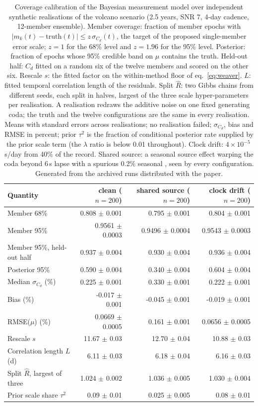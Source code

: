 \begin{table}
\footnotesize
\caption{Coverage calibration of the Bayesian measurement model over independent synthetic realisations of the volcano scenario (2.5 years, SNR 7, 4-day cadence, 12-member ensemble). Member coverage: fraction of member epochs with $|m_k(t)-\mathrm{truth}(t)|\le z\,\sigma_{C_d}(t)$, the target of the proposed single-member error scale; $z=1$ for the 68\% level and $z=1.96$ for the 95\% level. Posterior: fraction of epochs whose 95\% credible band on $\mu$ contains the truth. Held-out half: $C_d$ fitted on a random six of the twelve members and scored on the other six. Rescale $s$: the fitted factor on the within-method floor of eq.~\ref{eq:weaver}. $L$: fitted temporal correlation length of the residuals. Split $\hat R$: two Gibbs chains from different seeds, each split in halves, largest of the three scale hyper-parameters per realisation. A realisation redraws the additive noise on one fixed generating coda; the truth and the twelve configurations are the same in every realisation. Means with standard errors across realisations; no realisation failed; $\sigma_{C_d}$, bias and RMSE in percent; prior $\tau^2$ is the fraction of conditional posterior rate supplied by the prior scale term (the $\lambda$ ratio is below 0.01 throughout). Clock drift: $4\times10^{-5}$\,s/day from 40\% of the record. Shared source: a seasonal source effect warping the coda beyond 6\,s lapse with a spurious 0.2\% seasonal \dvv, seen by every configuration. Generated from the archived runs distributed with the paper.}
\label{tab:calibration}
\begin{tabularx}{\textwidth}{@{}Lrrr@{}}
\toprule
Quantity & clean ($n=200$) & shared source ($n=200$) & clock drift ($n=200$) \\
\midrule
Member 68\% & 0.808 $\pm$ 0.001 & 0.795 $\pm$ 0.001 & 0.804 $\pm$ 0.001 \\
Member 95\% & 0.9561 $\pm$ 0.0003 & 0.9496 $\pm$ 0.0004 & 0.9543 $\pm$ 0.0003 \\
Member 95\%, held-out half & 0.937 $\pm$ 0.004 & 0.930 $\pm$ 0.004 & 0.936 $\pm$ 0.004 \\
Posterior 95\% & 0.590 $\pm$ 0.004 & 0.340 $\pm$ 0.004 & 0.604 $\pm$ 0.004 \\
Median $\sigma_{C_d}$ (\%) & 0.225 $\pm$ 0.001 & 0.330 $\pm$ 0.001 & 0.222 $\pm$ 0.001 \\
Bias (\%) & -0.017 $\pm$ 0.001 & -0.045 $\pm$ 0.001 & -0.019 $\pm$ 0.001 \\
RMSE($\mu$) (\%) & 0.0669 $\pm$ 0.0005 & 0.161 $\pm$ 0.001 & 0.0656 $\pm$ 0.0005 \\
Rescale $s$ & 11.67 $\pm$ 0.03 & 12.70 $\pm$ 0.04 & 10.88 $\pm$ 0.03 \\
Correlation length $L$ (d) & 6.11 $\pm$ 0.03 & 6.18 $\pm$ 0.04 & 6.16 $\pm$ 0.03 \\
Split $\hat R$, largest of three & 1.024 $\pm$ 0.002 & 1.036 $\pm$ 0.005 & 1.030 $\pm$ 0.004 \\
Prior scale share $\tau^2$ & 0.09 $\pm$ 0.01 & 0.025 $\pm$ 0.005 & 0.08 $\pm$ 0.01 \\
\bottomrule
\end{tabularx}
\end{table}

